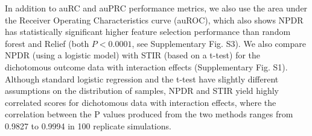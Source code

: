 \documentclass{bioinfo}
\begin{document}

In addition to auRC and auPRC performance metrics, we also use the area under the Receiver Operating Characteristics curve (auROC), which also shows NPDR has statistically significant higher feature selection performance than random forest and Relief (both $P < 0.0001$, see Supplementary Fig. S3).
We also compare NPDR (using a logistic model) with STIR (based on a t-test) for the dichotomous outcome data with interaction effects (Supplementary Fig. S1).
Although standard logistic regression and the t-test have slightly different assumptions on the distribution of samples, NPDR and STIR yield highly correlated scores for dichotomous data with interaction effects, where the correlation between the P values produced from the two methods ranges from 0.9827 to 0.9994 in 100 replicate simulations.
\end{document}
